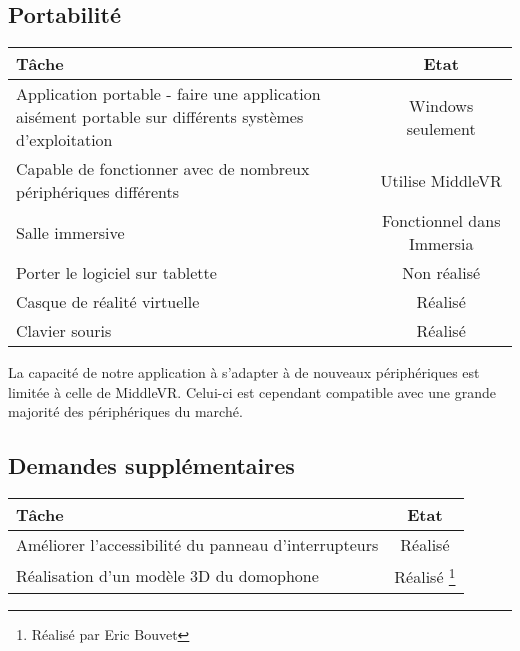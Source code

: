 \subsection{Portabilité}
\begin{tabular}{|p{11cm}|c|}
	\hline
	Tâche & Etat \\ \hline
	Application portable - faire une application aisément portable sur différents systèmes d'exploitation& Windows seulement \\ \hline
	Capable de fonctionner avec de nombreux périphériques différents & Utilise MiddleVR \\ \hline
	Salle immersive & Fonctionnel dans Immersia \\ \hline
	Porter le logiciel sur tablette  & Non réalisé \\ \hline
	Casque de réalité virtuelle & Réalisé \\ \hline
	Clavier souris & Réalisé \\ \hline
\end{tabular}
La capacité de notre application à s'adapter à de nouveaux périphériques est limitée à celle de MiddleVR. Celui-ci est cependant compatible avec une grande majorité des périphériques du marché.

\subsection{Demandes supplémentaires}
\begin{tabular}{|p{11cm}|c|}
	\hline
	Tâche & Etat \\ \hline
	Améliorer l'accessibilité du panneau d'interrupteurs & Réalisé \\ \hline
	Réalisation d'un modèle 3D du domophone & Réalisé \footnote{\samepage Réalisé par Eric Bouvet } \\ \hline
\end{tabular}
